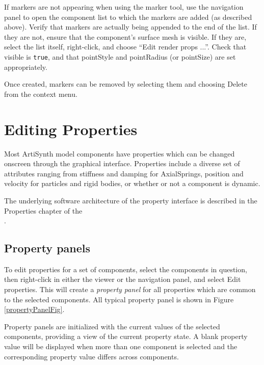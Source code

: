 \documentclass{article}
\begin{document}
\begin{sideblock}
If markers are not appearing when using the marker tool, use the
navigation panel to open the component list to which the markers are
added (as described above). Verify that markers are actually being
appended to the end of the list. If they are not, ensure that the
component's surface mesh is visible. If they are, select the list
itself, right-click, and choose {\sf ``Edit render props ...''}. Check
that {\sf visible} is {\tt true}, and that {\sf pointStyle} and {\sf
pointRadius} (or {\sf pointSize}) are set appropriately.
\end{sideblock}

Once created, markers can be removed by selecting them and choosing
{\sf Delete} from the context menu.

\section{Editing Properties}

Most ArtiSynth model components have properties which can be 
changed onscreen through the graphical interface. Properties
include a diverse set of attributes ranging from stiffness and
damping for AxialSprings, position and velocity for particles and
rigid bodies, or whether or not a component is dynamic.

The underlying software architecture of the property interface is 
described in the Properties chapter of the\\
.

\subsection{Property panels}
\label{propertyPanelsSec}

To edit properties for a set of components, select the components in
question, then right-click in either the viewer or the navigation
panel, and select {\sf Edit properties}. This will create a {\it property
panel} for all properties which are common to the selected components.
All typical property panel is shown in Figure \ref{propertyPanelFig}.

Property panels are initialized with the current values of the selected
components, providing a view of the current property state. A blank
property value will be displayed when more than one component is selected and 
the corresponding property value differs across components.
\end{document}
